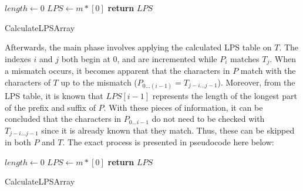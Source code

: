 \documentclass[12pt]{article}
\begin{document}
\begin{center}
\begin{singlespace}
\begin{minipage}{0.75\linewidth}
\begin{algorithm}[H]
	$length \leftarrow 0$ \;
	$LPS \leftarrow m * [0]$ \;
	\textbf{return} $LPS$
	\caption{CalculateLPSArray}
\end{algorithm}
\end{minipage}
\end{singlespace}
\end{center}

Afterwards, the main phase involves applying the calculated LPS table on $T$. The
indexes $i$ and $j$ both begin at 0, and are incremented while $P_{i}$ matches $T_{j}$. When a
mismatch occurs, it becomes apparent that the characters in $P$ match with the characters
of $T$ up to the mismatch ($P_{0 \ldots (i-1)} = T_{j-i \ldots j-1}$). Moreover, from the LPS table, it is known
that $LPS[i - 1]$ represents the length of the longest part of the prefix and suffix of $P$.
With these pieces of information, it can be concluded that the characters in $P_{0 \ldots i-1}$ do
not need to be checked with $T_{j-i \ldots j-1}$ since it is already known that they match. Thus,
these can be skipped in both $P$ and $T$. The exact process is presented in pseudocode here
below:

\begin{center}
\begin{singlespace}
\begin{minipage}{0.75\linewidth}
\begin{algorithm}[H]
	$length \leftarrow 0$ \;
	$LPS \leftarrow m * [0]$ \;
	\textbf{return} $LPS$
	\caption{CalculateLPSArray}
\end{algorithm}
\end{minipage}
\end{singlespace}
\end{center}
\end{document}
